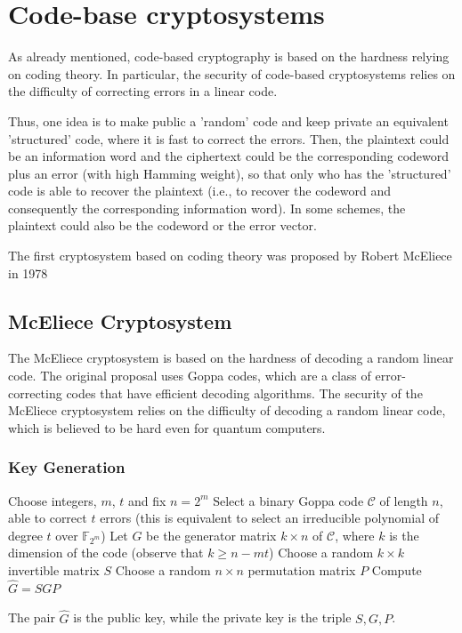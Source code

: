 \section{Code-base cryptosystems}
As already mentioned, code-based cryptography is based on the hardness relying on coding theory. In particular, the security of code-based cryptosystems relies on the difficulty of correcting errors in a linear code.
\medskip

\noindent
Thus, one idea is to make public a ’random’ code and keep private an
equivalent ’structured’ code, where it is fast to correct the errors. Then, the plaintext could be an information word and the ciphertext could be the corresponding codeword plus an error (with high Hamming weight),
so that only who has the ’structured’ code is able to recover the plaintext (i.e., to recover the codeword and consequently the corresponding information word). In some schemes, the plaintext could also be the codeword or the error vector.
\bigskip

\noindent
The first cryptosystem based on coding theory was proposed by Robert McEliece in 1978

\subsection{McEliece Cryptosystem}
The McEliece cryptosystem is based on the hardness of decoding a random linear code. The original proposal uses Goppa codes, which are a class of error-correcting codes that have efficient decoding algorithms. The security of the McEliece cryptosystem relies on the difficulty of decoding a random linear code, which is believed to be hard even for quantum computers.

\subsubsection{Key Generation}

\begin{algorithm}
\begin{algorithmic}[1]
    \State Choose integers, $m$, $t$ and fix $n = 2^m$
    \State Select a binary Goppa code $\mathcal{C}$ of length $n$, able to correct $t$ errors (this is equivalent to select an irreducible polynomial of degree $t$ over $\mathbb{F}_{2^m}$)
    \State Let $G$ be the generator matrix $k \times n$ of $\mathcal{C}$, where $k$ is the dimension of the code (observe that $k \geq n - mt$)
    \State Choose a random $k \times k$ invertible matrix $S$ 
    \State Choose a random $n \times n$ permutation matrix $P$
    \State Compute  $\hat{G} = SGP$
\end{algorithmic}
\end{algorithm}
\noindent
The pair $\hat{G}$ is the public key, while the private key is the triple $S, G, P$.

